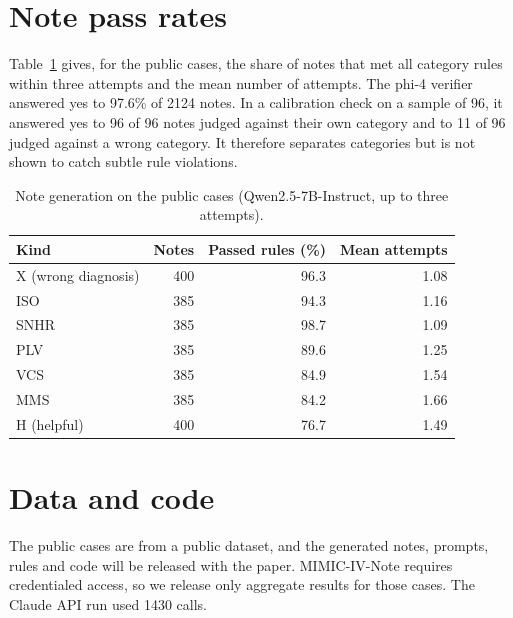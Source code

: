 \documentclass[11pt]{article}
\begin{document}


\appendix
\section{Note pass rates}\label{app:pass}
Table~\ref{tab:pass} gives, for the public cases, the share of notes that met all category rules within three attempts and the mean number of attempts. The phi-4 verifier answered yes to 97.6\% of 2124 notes. In a calibration check on a sample of 96, it answered yes to 96 of 96 notes judged against their own category and to 11 of 96 judged against a wrong category. It therefore separates categories but is not shown to catch subtle rule violations.

\begin{table}[h]
\centering
\caption{Note generation on the public cases (Qwen2.5-7B-Instruct, up to three attempts).}
\label{tab:pass}
\small
\begin{tabular}{@{}lrrr@{}}
\toprule
Kind & Notes & Passed rules (\%) & Mean attempts \\
\midrule
X (wrong diagnosis) & 400 & 96.3 & 1.08 \\
ISO & 385 & 94.3 & 1.16 \\
SNHR & 385 & 98.7 & 1.09 \\
PLV & 385 & 89.6 & 1.25 \\
VCS & 385 & 84.9 & 1.54 \\
MMS & 385 & 84.2 & 1.66 \\
H (helpful) & 400 & 76.7 & 1.49 \\
\bottomrule
\end{tabular}
\end{table}

\section{Data and code}
The public cases are from a public dataset, and the generated notes, prompts, rules and code will be released with the paper. MIMIC-IV-Note requires credentialed access, so we release only aggregate results for those cases. The Claude API run used 1430 calls.
\end{document}
